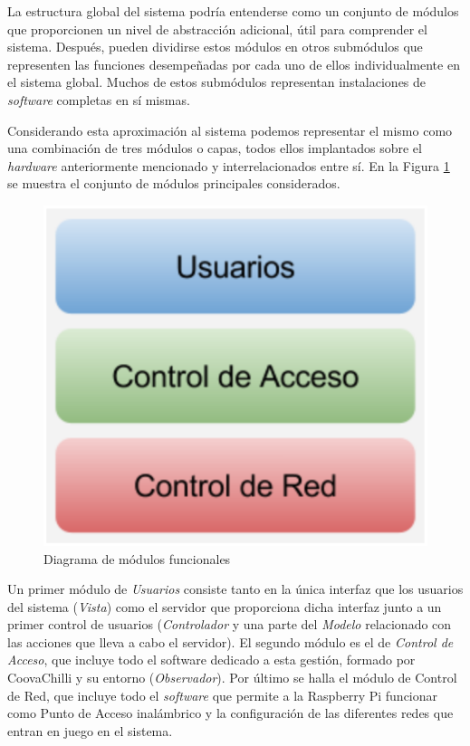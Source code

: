 La estructura global del sistema podría entenderse como un conjunto de módulos que proporcionen un nivel de abstracción adicional, útil para comprender el sistema. Después, pueden dividirse estos módulos en otros submódulos que representen las funciones desempeñadas por cada uno de ellos individualmente en el sistema global. Muchos de estos submódulos representan instalaciones de \emph{software} completas en sí mismas.

Considerando esta aproximación al sistema podemos representar el mismo como una combinación de tres módulos o capas, todos ellos implantados sobre el \emph{hardware} anteriormente mencionado y interrelacionados entre sí. En la Figura \ref{modulos} se muestra el conjunto de módulos principales considerados.

\begin{figure}[!t]
\begin{center}
\includegraphics[width=0.75\linewidth]{./4_AnalisisFuncional/Img/modulos.png}
\end{center}
\caption{Diagrama de módulos funcionales}
\label{modulos}
\end{figure}

Un primer módulo de \emph{Usuarios} consiste tanto en la única interfaz que los usuarios del sistema (\emph{Vista}) como el servidor que proporciona dicha interfaz junto a un primer control de usuarios (\emph{Controlador} y una parte del \emph{Modelo} relacionado con las acciones que lleva a cabo el servidor). El segundo módulo es el de \emph{Control de Acceso}, que incluye todo el software dedicado a esta gestión, formado por CoovaChilli y su entorno (\emph{Observador}). Por último se halla el módulo de Control de Red, que incluye todo el \emph{software} que permite a la Raspberry Pi funcionar como Punto de Acceso inalámbrico y la configuración de las diferentes redes que entran en juego en el sistema.


